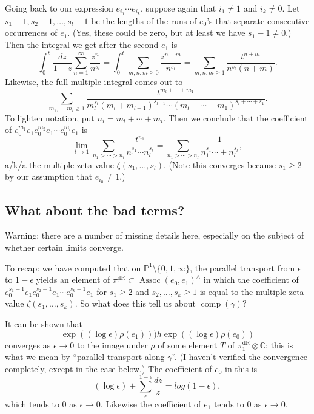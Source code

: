 \documentclass[12pt]{article}
\def\CC{\mathbb{C}}
\def\PP{\mathbb{P}}
\DeclareMathOperator{\Assoc}{Assoc}
\DeclareMathOperator{\comp}{comp}
\DeclareMathOperator{\dR}{dR}
\begin{document}
Going back to our expression $e_{i_1}\cdots e_{i_k}$, suppose again that
$i_1 \neq 1$ and $i_k \neq 0$. Let $s_1-1, s_2-1, \dots, s_l-1$ 
be the lengths of the
runs of $e_0$'s that separate consecutive occurrences of $e_1$. (Yes, these
could be zero, but at least we have $s_1-1 \neq 0$.) Then the integral
we get after the second $e_1$ is
\[
\int_0^t \frac{dz}{1-z} \sum_{n=1}^\infty \frac{z^n}{n^{s_l}} =
\int_0^t \sum_{m,n: m \geq 0} \frac{z^{n+m}}{n^{s_l}}
= \sum_{m,n: m \geq 1} \frac{t^{n+m}}{n^{s_l}(n+m)}.
\]
Likewise, the full multiple integral comes out to
\[
\sum_{m_1, \dots, m_l \geq 1} \frac{t^{m_l + \cdots + m_1}}{m_l^{s_l}
(m_l+m_{l-1})^{s_{l-1}} \cdots (m_l + \cdots + m_1)^{s_l + \cdots + s_1}}.
\]
To lighten notation, put $n_i = m_l + \cdots + m_i$. Then we conclude that
the coefficient of $e_0^{m_1} e_1 e_0^{m_2}e_1\cdots e_0^{m_l}e_1$ is
\[
\lim_{t \to 1} \sum_{n_1> \cdots > n_l} \frac{t^{n_1}}{n_1^{s_1}\cdots
n_l^{s_l}} = \sum_{n_1 > \cdots > n_l} \frac{1}{n_1^{s_1} \cdots + 
n_l^{s_l}},
\]
a/k/a the multiple zeta value $\zeta(s_1, \dots, s_l)$.
(Note this converges because $s_1 \geq 2$ by our assumption that
$e_{i_0} \neq 1$.)

\subsection*{What about the bad terms?}

Warning: there are a number of missing details here, especially on the
subject of whether certain limits converge.

To recap: we have computed that on $\PP^1 \setminus \{0,1, \infty\}$, the
parallel transport from $\epsilon$ to $1 - \epsilon$ yields an element
of $\pi_1^{\dR} \subset \Assoc(e_0, e_1)^\wedge$ in which the
coefficient
of $e_0^{s_1-1} e_1 e_0^{s_2-1}e_1\cdots e_0^{s_k-1}e_1$ for
$s_1 \geq 2$ and $s_2, \dots, s_k \geq 1$ is equal to the multiple
zeta value $\zeta(s_1, \dots, s_k)$. So what does this tell us about
$\comp(\gamma)$?

It can be shown that
\[
\exp((\log \epsilon) \rho(e_1))) h \exp((\log \epsilon) \rho(e_0))
\]
converges as $\epsilon \to 0$ to the image under $\rho$ of some
element $T$ of $\pi_1^{\dR} \otimes \CC$; 
this is what we mean by ``parallel transport
along $\gamma$''. (I haven't
verified the convergence completely, except in the case below.)
The coefficient
of $e_0$ in this is
\[
(\log \epsilon) + \sum_{\epsilon}^{1-\epsilon} \frac{dz}{z}
= log (1 - \epsilon),
\]
which tends to 0 as $\epsilon \to 0$. Likewise the coefficient of $e_1$
tends to 0 as $\epsilon \to 0$.
\end{document}
